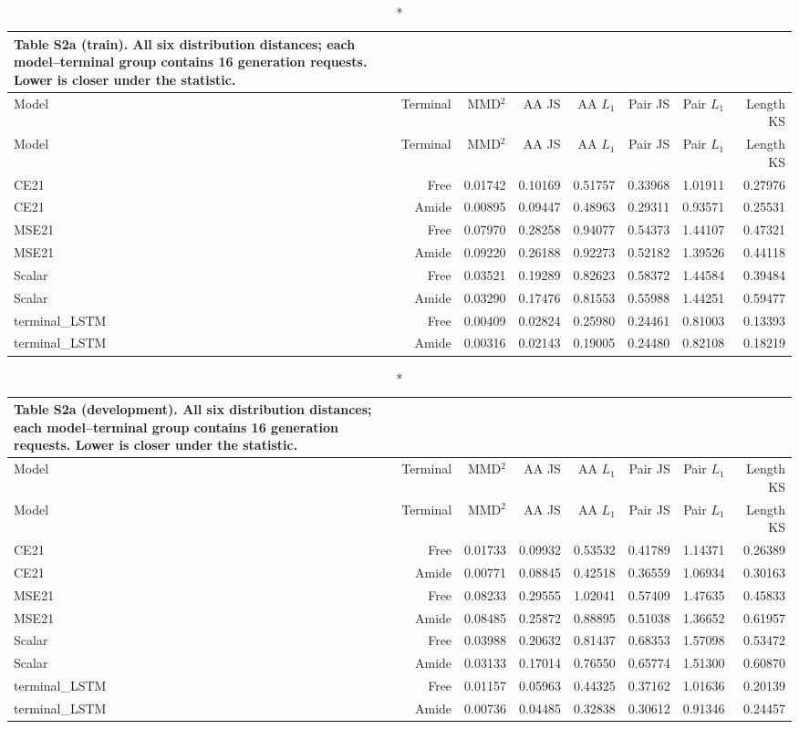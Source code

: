 \begingroup\small\setlength{\tabcolsep}{4pt}\renewcommand{\arraystretch}{1.15}
\begin{longtable}{lrrrrrrr}
\caption*{\textbf{Table S2a (train).} All six distribution distances; each model--terminal group contains 16 generation requests. Lower is closer under the statistic.}\\
\toprule
Model & Terminal & MMD$^2$ & AA JS & AA $L_1$ & Pair JS & Pair $L_1$ & Length KS \\
\midrule\endfirsthead
Model & Terminal & MMD$^2$ & AA JS & AA $L_1$ & Pair JS & Pair $L_1$ & Length KS \\
\midrule\endhead
CE21 & Free & 0.01742 & 0.10169 & 0.51757 & 0.33968 & 1.01911 & 0.27976 \\
CE21 & Amide & 0.00895 & 0.09447 & 0.48963 & 0.29311 & 0.93571 & 0.25531 \\
MSE21 & Free & 0.07970 & 0.28258 & 0.94077 & 0.54373 & 1.44107 & 0.47321 \\
MSE21 & Amide & 0.09220 & 0.26188 & 0.92273 & 0.52182 & 1.39526 & 0.44118 \\
Scalar & Free & 0.03521 & 0.19289 & 0.82623 & 0.58372 & 1.44584 & 0.39484 \\
Scalar & Amide & 0.03290 & 0.17476 & 0.81553 & 0.55988 & 1.44251 & 0.59477 \\
terminal\_LSTM & Free & 0.00409 & 0.02824 & 0.25980 & 0.24461 & 0.81003 & 0.13393 \\
terminal\_LSTM & Amide & 0.00316 & 0.02143 & 0.19005 & 0.24480 & 0.82108 & 0.18219 \\
\bottomrule\end{longtable}\endgroup
\begingroup\small\setlength{\tabcolsep}{4pt}\renewcommand{\arraystretch}{1.15}
\begin{longtable}{lrrrrrrr}
\caption*{\textbf{Table S2a (development).} All six distribution distances; each model--terminal group contains 16 generation requests. Lower is closer under the statistic.}\\
\toprule
Model & Terminal & MMD$^2$ & AA JS & AA $L_1$ & Pair JS & Pair $L_1$ & Length KS \\
\midrule\endfirsthead
Model & Terminal & MMD$^2$ & AA JS & AA $L_1$ & Pair JS & Pair $L_1$ & Length KS \\
\midrule\endhead
CE21 & Free & 0.01733 & 0.09932 & 0.53532 & 0.41789 & 1.14371 & 0.26389 \\
CE21 & Amide & 0.00771 & 0.08845 & 0.42518 & 0.36559 & 1.06934 & 0.30163 \\
MSE21 & Free & 0.08233 & 0.29555 & 1.02041 & 0.57409 & 1.47635 & 0.45833 \\
MSE21 & Amide & 0.08485 & 0.25872 & 0.88895 & 0.51038 & 1.36652 & 0.61957 \\
Scalar & Free & 0.03988 & 0.20632 & 0.81437 & 0.68353 & 1.57098 & 0.53472 \\
Scalar & Amide & 0.03133 & 0.17014 & 0.76550 & 0.65774 & 1.51300 & 0.60870 \\
terminal\_LSTM & Free & 0.01157 & 0.05963 & 0.44325 & 0.37162 & 1.01636 & 0.20139 \\
terminal\_LSTM & Amide & 0.00736 & 0.04485 & 0.32838 & 0.30612 & 0.91346 & 0.24457 \\
\bottomrule\end{longtable}\endgroup

